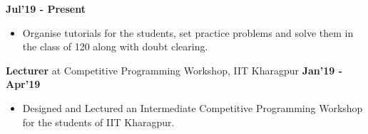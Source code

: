 \documentclass[10pt]{article}
\begin{document}
\href{https://github.com/shmundhra/Credentials/tree/master/Teaching\%20Ventures} {\hspace{0.5ex}\faMousePointer}
{\hfill} \textbf{Jul'19 - Present}\\[-1.9em]
\begin{itemize}
    \item Organise tutorials for the students, set practice problems and solve them in the class of 120 along with doubt clearing.\\[-1.25em]
\end{itemize}
\large { \textbf{Lecturer} at Competitive Programming Workshop, IIT Kharagpur} \normalsize
\href{https://github.com/shmundhra/Credentials/tree/master/Teaching\%20Ventures} {\hspace{0.5ex}\faMousePointer}
{\hfill} \textbf{Jan'19 - Apr'19}\\[-1.9em]
\begin{itemize}
    \item Designed and Lectured an Intermediate Competitive Programming Workshop for the students of IIT Kharagpur.\\[-2em]
\end{itemize}
\end{document}
